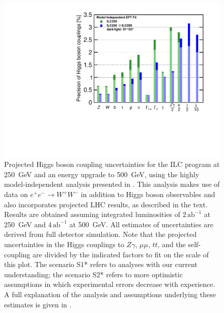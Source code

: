 \documentclass[%
 reprint,
 floatfix,
 amsmath,amssymb,
 aps,
]{revtex4-1}
\def\ee{e^+e^-}
\begin{document}
\begin{figure}
\begin{center}
\includegraphics[width=0.99\hsize]{figures/ModelindepSummary.pdf}
\caption{Projected Higgs boson coupling uncertainties for the ILC
  program at 250~GeV and an energy upgrade to 500~GeV, using the
  highly model-independent analysis presented in \cite{Barklow:2017suo}. This  analysis makes use of  data on $\ee\to W^+W^-$ in addition to Higgs boson observables and also incorporates projected LHC results, as described  in the text. Results are obtained assuming integrated luminosities of $2\,{\mathrm{ab}}^{-1}$ at 250~GeV and $4\,{\mathrm{ab}}^{-1}$ at 500~GeV. All estimates of uncertainties are derived from full detector simulation. Note that the projected uncertainties in the Higgs couplings to $Z\gamma$, $\mu\mu$, $tt$, and the self-coupling are divided by the indicated factors to fit on the scale of this plot. The scenario S1* refers to analyses with our current understanding; the scenario S2* refers to more optimistic assumptions in which experimental errors decrease with experience.   A full explanation of the analysis and assumptions underlying these estimates is given in \cite{ILCforESS}.}
\label{fig:ILCmodelindep}
\end{center}
\vspace{-0.7cm}
\end{figure}
\end{document}
